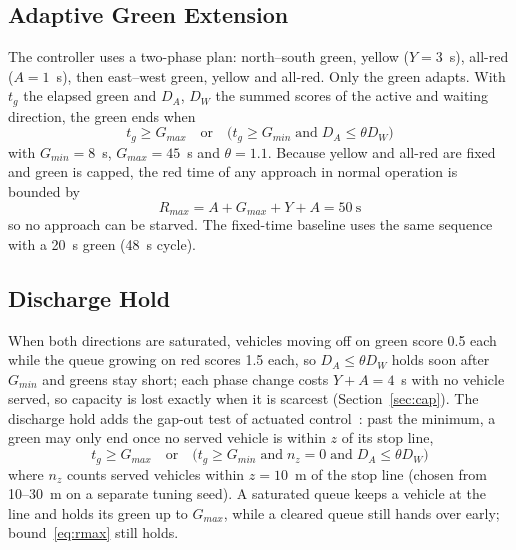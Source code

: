 \subsection{Adaptive Green Extension}
The controller uses a two-phase plan: north--south green, yellow ($Y = 3$~s), all-red ($A = 1$~s), then east--west green, yellow and all-red. Only the green adapts. With $t_g$ the elapsed green and $D_A$, $D_W$ the summed scores of the active and waiting direction, the green ends when
\begin{equation}
t_g \ge G_{max} \quad\text{or}\quad \bigl(t_g \ge G_{min} \;\text{and}\; D_A \le \theta D_W\bigr)
\label{eq:green}
\end{equation}
with $G_{min} = 8$~s, $G_{max} = 45$~s and $\theta = 1.1$. Because yellow and all-red are fixed and green is capped, the red time of any approach in normal operation is bounded by
\begin{equation}
R_{max} = A + G_{max} + Y + A = 50\ \text{s}
\label{eq:rmax}
\end{equation}
so no approach can be starved. The fixed-time baseline uses the same sequence with a 20~s green (48~s cycle).

\subsection{Discharge Hold}
\label{sec:hold}
When both directions are saturated, vehicles moving off on green score 0.5 each while the queue growing on red scores 1.5 each, so $D_A \le \theta D_W$ holds soon after $G_{min}$ and greens stay short; each phase change costs $Y + A = 4$~s with no vehicle served, so capacity is lost exactly when it is scarcest (Section~\ref{sec:cap}). The discharge hold adds the gap-out test of actuated control~\cite{ref23}: past the minimum, a green may only end once no served vehicle is within $z$ of its stop line,
\begin{equation}
t_g \ge G_{max} \quad\text{or}\quad \bigl(t_g \ge G_{min} \;\text{and}\; n_z = 0 \;\text{and}\; D_A \le \theta D_W\bigr)
\label{eq:hold}
\end{equation}
where $n_z$ counts served vehicles within $z = 10$~m of the stop line (chosen from 10--30~m on a separate tuning seed). A saturated queue keeps a vehicle at the line and holds its green up to $G_{max}$, while a cleared queue still hands over early; bound~\eqref{eq:rmax} still holds.

